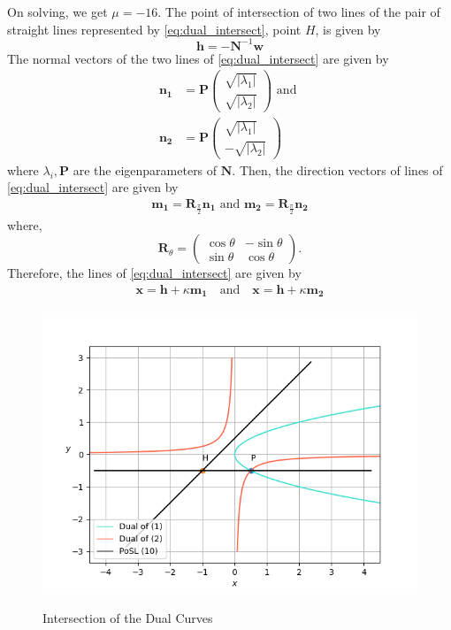 \documentclass[journal,12pt,twocolumn]{IEEEtran}
\let\vec\mathbf
\newcommand{\myvec}[1]{\ensuremath{\begin{pmatrix}#1\end{pmatrix}}}
\providecommand{\brak}[1]{\ensuremath{\left(#1\right)}}
\providecommand{\abs}[1]{\left\vert#1\right\vert}
\begin{document}
On solving, we get $\mu=-16$. %
The point of intersection of two lines of the pair of straight lines represented by \eqref{eq:dual_intersect}, point $H$, is given by %
\begin{equation}
		\vec{h} = -\vec{N}^{-1}\vec{w} %
\end{equation}
The normal vectors of the two lines of \eqref{eq:dual_intersect} are given by
\begin{align*}
		\vec{n_1} &= \vec{P}\myvec{\sqrt{\abs{\lambda_1}}\\ \sqrt{\abs{\lambda_2}}} \text{ and } \\
		\vec{n_2} &= \vec{P}\myvec{\sqrt{\abs{\lambda_1}}\\ -\sqrt{\abs{\lambda_2}}}
\end{align*}
where $\lambda_i, \vec{P}$ are the eigenparameters of $\vec{N}$. Then, the direction vectors of lines of \eqref{eq:dual_intersect} are given by
\begin{gather}
		\vec{m_1} = \vec{R}_{\frac{\pi}{2}}\vec{n_1} \text{ and } \vec{m_2} = \vec{R}_{\frac{\pi}{2}}\vec{n_2}
\end{gather}
where, \[ \vec{R}_{\theta} = \myvec{\cos  \theta & -\sin \theta \\ \sin \theta & \cos \theta} \text{.} \]
Therefore, the lines of \eqref{eq:dual_intersect} are given by
\begin{align*}
		\vec{x} = \vec{h} + \kappa\vec{m_1} \quad \text{and} \quad
		\vec{x} = \vec{h} + \kappa\vec{m_2} 
\end{align*}
\vspace{-0.5cm}
\begin{figure}[h]
\centering
%
\includegraphics[width=\columnwidth]{figs/dual_int.png}
\label{fig:dual_int}
\caption{Intersection of the Dual Curves}
\end{figure}
\end{document}
